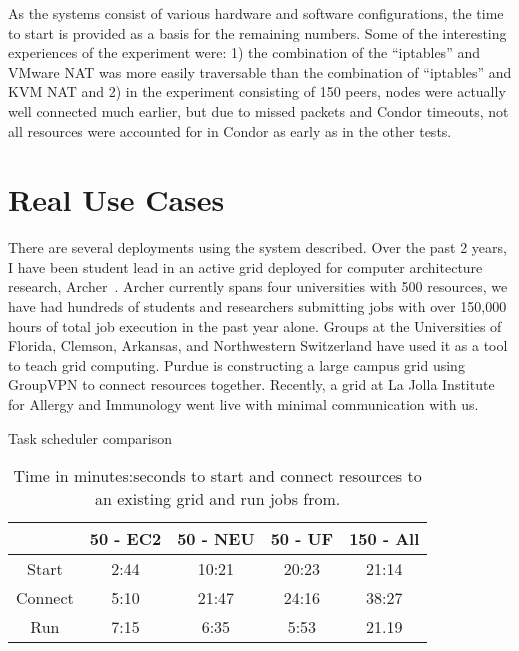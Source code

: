 As the systems consist of various hardware and software configurations, the
time to start is provided as a basis for the remaining numbers.  Some of the
interesting experiences of the experiment were:  1) the combination of the
``iptables'' and VMware NAT was more easily traversable than the combination
of ``iptables'' and KVM NAT and 2) in the experiment consisting of 150 peers,
nodes were actually well connected much earlier, but due to missed packets and
Condor timeouts, not all resources were accounted for in Condor as early as in
the other tests.

\section{Real Use Cases}
There are several deployments using the system described.  Over the past 2
years, I have been student lead in an active grid deployed for computer
architecture research, Archer~\cite{archer}.  Archer currently spans four
universities with 500 resources, we have had hundreds of students and
researchers submitting jobs with over 150,000 hours of total job execution in
the past year alone.  Groups at the Universities of Florida, Clemson, Arkansas,
and Northwestern Switzerland have used it as a tool to teach grid computing.
Purdue is constructing a large campus grid using GroupVPN to connect resources
together.  Recently, a grid at La Jolla Institute for Allergy and Immunology
went live with minimal communication with us.

\begin{table}[ht]
\centering
\caption{Task scheduler comparison}
\label{tab:task_schedulers}
\end{table}

\begin{table}[ht]
\centering
\begin{tabular}{|c||c|c|c|c|} \hline
& 50 - EC2 & 50 - NEU & 50 - UF & 150 - All \\ \hline\hline
Start & 2:44 & 10:21 & 20:23 & 21:14 \\ \hline
Connect & 5:10 & 21:47 & 24:16 & 38:27\\ \hline
Run & 7:15 & 6:35 & 5:53 & 21.19 \\ \hline
\end{tabular}
\caption[Grid creation times]{Time in minutes:seconds to start and connect
resources to an existing grid and run jobs from.}
\label{fig:results}
\end{table}

